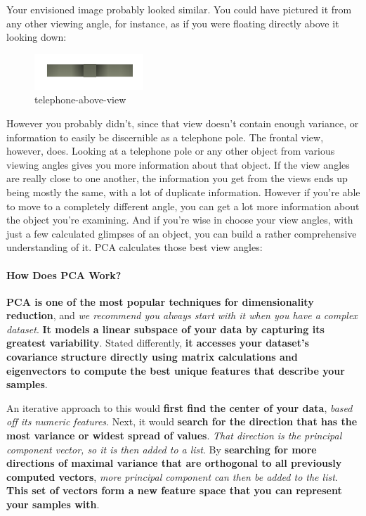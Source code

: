 \documentclass[11pt]{article}
\makeatletter
\def\maxwidth{\ifdim\Gin@nat@width>\linewidth\linewidth
    \else\Gin@nat@width\fi}
\let\Oldincludegraphics\includegraphics
\renewcommand{\includegraphics}[1]{\Oldincludegraphics[width=.8\maxwidth]{#1}}
\makeatother
\begin{document}
Your envisioned image probably looked similar. You could have pictured
it from any other viewing angle, for instance, as if you were floating
directly above it looking down:

\begin{figure}
\centering
\includegraphics{pic/telephone-above.png}
\caption{telephone-above-view}
\end{figure}

However you probably didn't, since that view doesn't contain enough
variance, or information to easily be discernible as a telephone pole.
The frontal view, however, does. Looking at a telephone pole or any
other object from various viewing angles gives you more information
about that object. If the view angles are really close to one another,
the information you get from the views ends up being mostly the same,
with a lot of duplicate information. However if you're able to move to a
completely different angle, you can get a lot more information about the
object you're examining. And if you're wise in choose your view angles,
with just a few calculated glimpses of an object, you can build a rather
comprehensive understanding of it. PCA calculates those best view
angles:

\hypertarget{how-does-pca-work}{%
\paragraph{How Does PCA Work?}\label{how-does-pca-work}}

\textbf{PCA is one of the most popular techniques for dimensionality
reduction}, and \emph{we recommend you always start with it when you
have a complex dataset}. \textbf{It models a linear subspace of your
data by capturing its greatest variability}. Stated differently,
\textbf{it accesses your dataset's covariance structure directly using
matrix calculations and eigenvectors to compute the best unique features
that describe your samples}.

An iterative approach to this would \textbf{first find the center of
your data}, \emph{based off its numeric features}. Next, it would
\textbf{search for the direction that has the most variance or widest
spread of values}. \emph{That direction is the principal component
vector, so it is then added to a list}. By \textbf{searching for more
directions of maximal variance that are orthogonal to all previously
computed vectors}, \emph{more principal component can then be added to
the list}. \textbf{This set of vectors form a new feature space that you
can represent your samples with}.
\end{document}
